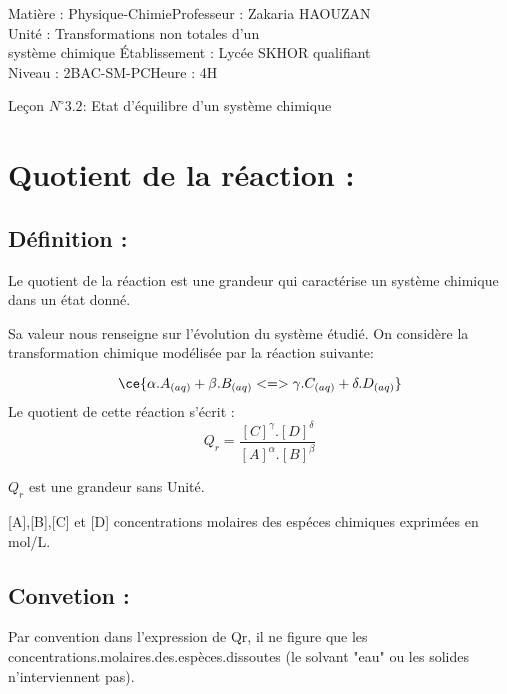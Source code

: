 \documentclass[12pt]{article}
\author{Zakaria HAOUZAN}
\date{\today}
\newcommand\headerMe[2]{\noindent{}#1\hfill#2}
\begin{document}
\headerMe{Matière : Physique-Chimie}{Professeur : Zakaria HAOUZAN}\\
\headerMe{Unité : Transformations non totales d'un\\système chimique  }{Établissement : Lycée SKHOR qualifiant}\\
\headerMe{Niveau : 2BAC-SM-PC}{Heure : 4H}\\

\begin{center}

    \Large{Leçon $N^{\circ} 3.2 $: \color{red} Etat d'équilibre d'un système chimique }
\end{center}

\section{Quotient de la réaction :}
\subsection{Définition :}
Le quotient de la réaction est une grandeur qui caractérise un système chimique dans un état donné.

Sa valeur nous renseigne sur l'évolution du système étudié.
On considère la transformation chimique modélisée par la réaction suivante:

$$\ce{\alpha.A_{(aq)} + \beta.B_{(aq)} <=> \gamma.C_{(aq)} + \delta.D_{(aq)}}$$
Le quotient de cette réaction  s'écrit : $$Q_r = \frac{[C]^{\gamma}.[D]^{\delta}}{[A]^{\alpha}.[B]^{\beta}}$$

$Q_r$ est une grandeur sans Unité.

[A],[B],[C] et [D] concentrations molaires des espéces chimiques exprimées en mol/L.

\subsection{Convetion : }
Par convention dans l'expression de Qr, il ne figure que les concentrations.molaires.des.espèces.dissoutes (le solvant "eau" ou les solides n'interviennent pas).
\end{document}
